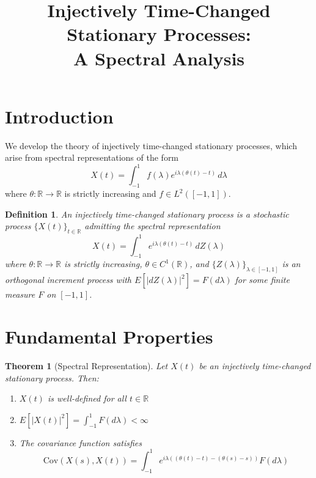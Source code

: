 \documentclass[11pt]{article}
\title{Injectively Time-Changed Stationary Processes:\\ A Spectral Analysis}
\author{}
\date{}
\newtheorem{theorem}{Theorem}
\newtheorem{definition}{Definition}
\begin{document}
\maketitle

\section{Introduction}

We develop the theory of injectively time-changed stationary processes, which arise from spectral representations of the form
\begin{equation}
X(t) = \int_{-1}^1 f(\lambda) e^{i\lambda(\theta(t)-t)} \, d\lambda
\end{equation}
where $\theta: \mathbb{R} \to \mathbb{R}$ is strictly increasing and $f \in L^2([-1,1])$.

\begin{definition}
An \emph{injectively time-changed stationary process} is a stochastic process $\{X(t)\}_{t \in \mathbb{R}}$ admitting the spectral representation
\begin{equation}
X(t) = \int_{-1}^1 e^{i\lambda(\theta(t)-t)} \, dZ(\lambda)
\end{equation}
where $\theta: \mathbb{R} \to \mathbb{R}$ is strictly increasing, $\theta \in C^1(\mathbb{R})$, and $\{Z(\lambda)\}_{\lambda \in [-1,1]}$ is an orthogonal increment process with $E[|dZ(\lambda)|^2] = F(d\lambda)$ for some finite measure $F$ on $[-1,1]$.
\end{definition}

\section{Fundamental Properties}

\begin{theorem}[Spectral Representation]
Let $X(t)$ be an injectively time-changed stationary process. Then:
\begin{enumerate}
\item $X(t)$ is well-defined for all $t \in \mathbb{R}$
\item $E[|X(t)|^2] = \int_{-1}^1 F(d\lambda) < \infty$
\item The covariance function satisfies
\begin{equation}
\text{Cov}(X(s),X(t)) = \int_{-1}^1 e^{i\lambda((\theta(t)-t)-(\theta(s)-s))} F(d\lambda)
\end{equation}
\end{enumerate}
\end{theorem}
\end{document}
